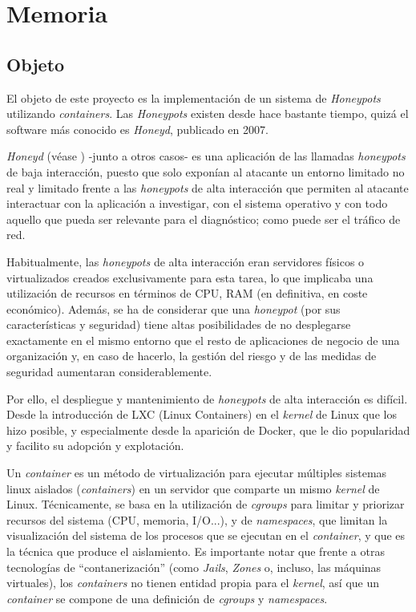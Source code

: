 \chapter{Memoria}
\minitoc{}
\section{Objeto}
El objeto de este proyecto es la implementación de un sistema de \emph{Honeypots} utilizando \emph{containers}. 
Las \emph{Honeypots} existen desde hace bastante tiempo, quizá el software más conocido es \emph{Honeyd}, publicado en 2007.

\emph{Honeyd} (véase \cite{honeynet-lowinteraction}) -junto a otros casos- es  una aplicación de las llamadas \emph{honeypots} de baja interacción, puesto que solo exponían al atacante un entorno limitado
no real y limitado frente a las \emph{honeypots} de alta interacción que permiten al atacante interactuar con la aplicación a investigar, con el sistema operativo
y con todo aquello que pueda ser relevante para el diagnóstico; como puede ser el tráfico de red.

Habitualmente, las \emph{honeypots} de alta interacción eran servidores físicos o virtualizados creados exclusivamente para esta tarea, lo que implicaba
una utilización de recursos en términos de CPU, RAM (en definitiva, en coste económico). Además, se ha de considerar que una \emph{honeypot} (por sus características
y seguridad) tiene altas posibilidades de no desplegarse exactamente en el mismo entorno que el resto de aplicaciones de negocio de una organización y, en caso de hacerlo,
la gestión del riesgo y de las medidas de seguridad aumentaran considerablemente.

Por ello, el despliegue y mantenimiento de \emph{honeypots}  de alta interacción es difícil. Desde la introducción de LXC (Linux Containers) en el \emph{kernel} de Linux que los hizo posible, y
especialmente desde la aparición de Docker, que le dio popularidad y facilito su adopción y explotación.

Un \emph{container} es un método de virtualización para ejecutar múltiples sistemas linux aislados (\emph{containers}) en un servidor que comparte un mismo \emph{kernel} de Linux. Técnicamente, se basa en la utilización
de \emph{cgroups} para limitar y priorizar recursos del sistema (CPU, memoria, I/O...), y de \emph{namespaces}, que limitan la visualización del sistema de los procesos que se ejecutan en el \emph{container}, y que es la técnica que produce el aislamiento. Es importante notar que
frente a otras tecnologías de ``contanerización'' (como \emph{Jails}, \emph{Zones} o, incluso, las máquinas virtuales), los \emph{containers} no tienen entidad propia para el \emph{kernel}, así que un \emph{container} se compone
de una definición de \emph{cgroups} y \emph{namespaces}. 

